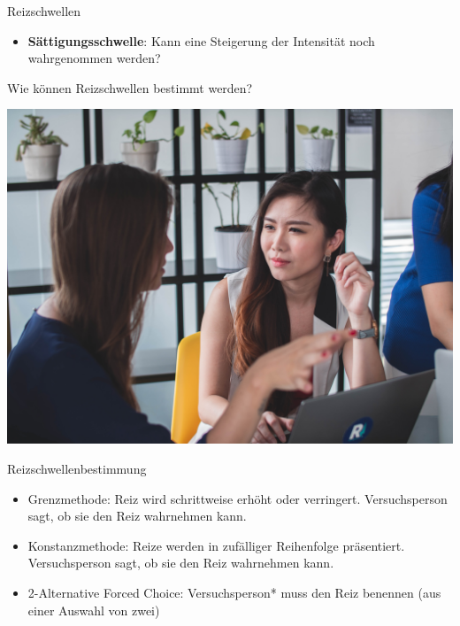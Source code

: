 \documentclass{beamer}
\begin{document}
\begin{frame}{Reizschwellen}
\begin{itemize}
\begin{columns}[c]
\begin{column}{3cm}
    \end{column}
    
\end{columns}

$\,$\\

 
    \item
\textbf{Sättigungsschwelle}: Kann eine Steigerung der Intensität noch wahrgenommen werden?
\end{itemize}
    
    
\end{frame}


\begin{frame}{Wie können Reizschwellen bestimmt werden?}

\begin{center}
    \includegraphics[width=\textwidth]{zweiergespraech.jpg}
\end{center}

    
\end{frame}




\begin{frame}{Reizschwellenbestimmung}

\begin{itemize}
    \item 
    Grenzmethode: Reiz wird schrittweise erhöht oder verringert. Versuchsperson sagt, ob sie den Reiz wahrnehmen kann.
    \item
    Konstanzmethode: Reize werden in zufälliger Reihenfolge präsentiert. Versuchsperson sagt, ob sie den Reiz wahrnehmen kann.
    \item
    2-Alternative Forced Choice: Versuchsperson* muss den Reiz benennen (aus einer Auswahl von zwei) 
\end{itemize}

\end{frame}
\end{document}
